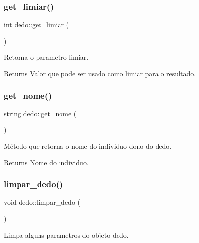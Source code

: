 \subsubsection{\texorpdfstring{get\+\_\+limiar()}{get\_limiar()}}
{\footnotesize\ttfamily int dedo\+::get\+\_\+limiar (\begin{DoxyParamCaption}{ }\end{DoxyParamCaption})}



Retorna o parametro limiar. 

\begin{DoxyReturn}{Returns}
Valor que pode ser usado como limiar para o resultado. 
\end{DoxyReturn}
\mbox{\label{classdedo_a3703ecb795fd327b28d9fda72de3a702}} 
\subsubsection{\texorpdfstring{get\+\_\+nome()}{get\_nome()}}
{\footnotesize\ttfamily string dedo\+::get\+\_\+nome (\begin{DoxyParamCaption}{ }\end{DoxyParamCaption})}



Método que retorna o nome do individuo dono do dedo. 

\begin{DoxyReturn}{Returns}
Nome do individuo. 
\end{DoxyReturn}
\mbox{\label{classdedo_a329de08f6e37adea96e36b9ee2c490de}} 
\subsubsection{\texorpdfstring{limpar\+\_\+dedo()}{limpar\_dedo()}}
{\footnotesize\ttfamily void dedo\+::limpar\+\_\+dedo (\begin{DoxyParamCaption}{ }\end{DoxyParamCaption})}



Limpa alguns parametros do objeto dedo. 

\mbox{\label{classdedo_acadef8b9556703a74d277907c119b265}} 
